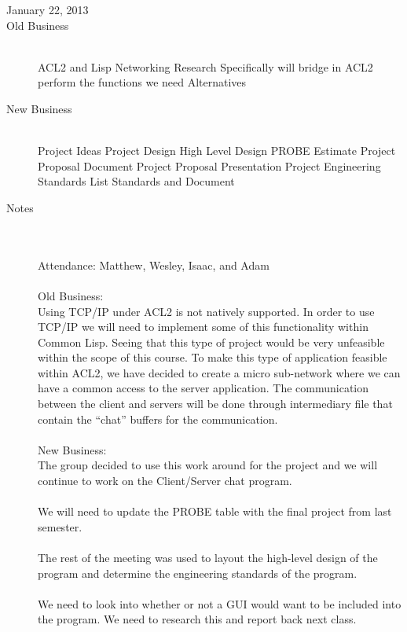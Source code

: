 \documentclass[11pt, letterpaper]{report}
\begin{document}
\begin{description}
\newpage
\item[\Large January 22, 2013] 
\hypertarget{January 22, 2013} {}
\item[Old Business] \hfill \\
\subitem ACL2 and Lisp Networking Research
\subsubitem Specifically will bridge in ACL2 perform the functions we need
\subsubitem Alternatives
\item[New Business] \hfill \\
\subitem Project Ideas
\subitem Project Design 
\subsubitem High Level Design
\subsubitem PROBE Estimate
\subitem Project Proposal
\subsubitem Document
\subitem Project Proposal Presentation
\subitem Project Engineering Standards
\subsubitem List Standards and Document
\item[Notes] \hfill \\ \hfill \\
Attendance: Matthew, Wesley, Isaac, and Adam \\ \\
Old Business: \\
Using TCP/IP under ACL2 is not natively supported. In order to use TCP/IP we will need to implement some of this functionality within Common Lisp. Seeing that this type of project would be very unfeasible within the scope of this course. To make this type of application feasible within ACL2, we have decided to create a micro sub-network where we can have a common access to the server application. The communication between the client and servers will be done through intermediary file that contain the ``chat'' buffers for the communication. \\ \\
New Business: \\
The group decided to use this work around for the project and we will continue to work on the Client/Server chat program. \\ \\
We will need to update the PROBE table with the final project from last semester. \\ \\ 
The rest of the meeting was used to layout the high-level design of the program and determine the engineering standards of the program.\\ \\
We need to look into whether or not a GUI would want to be included into the program. We need to research this and report back next class.



\end{description}
\end{document}

